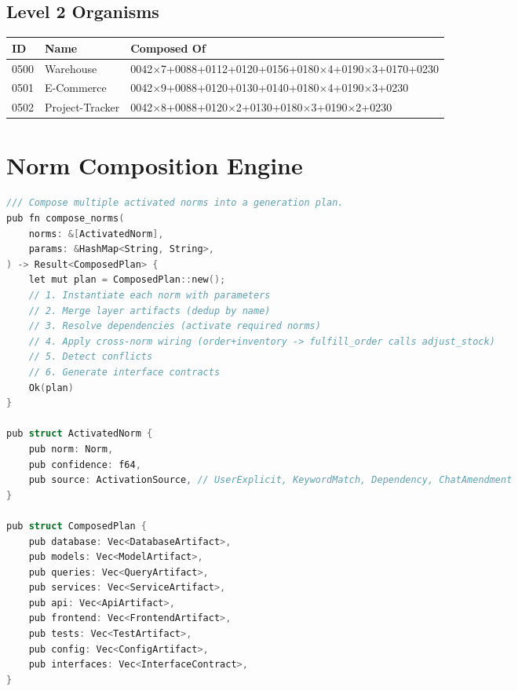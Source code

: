 \documentclass[11pt,a4paper]{article}
\begin{document}
\subsection{Level 2 Organisms}

\begin{center}
\scriptsize
\begin{tabular}{llp{8cm}}
\toprule
\textbf{ID} & \textbf{Name} & \textbf{Composed Of} \\
\midrule
0500 & Warehouse & 0042$\times$7+0088+0112+0120+0156+0180$\times$4+0190$\times$3+0170+0230 \\
0501 & E-Commerce & 0042$\times$9+0088+0120+0130+0140+0180$\times$4+0190$\times$3+0230 \\
0502 & Project-Tracker & 0042$\times$8+0088+0120$\times$2+0130+0180$\times$3+0190$\times$2+0230 \\
\bottomrule
\end{tabular}
\end{center}

\section{Norm Composition Engine}

\begin{lstlisting}[language=C]
/// Compose multiple activated norms into a generation plan.
pub fn compose_norms(
    norms: &[ActivatedNorm],
    params: &HashMap<String, String>,
) -> Result<ComposedPlan> {
    let mut plan = ComposedPlan::new();
    // 1. Instantiate each norm with parameters
    // 2. Merge layer artifacts (dedup by name)
    // 3. Resolve dependencies (activate required norms)
    // 4. Apply cross-norm wiring (order+inventory -> fulfill_order calls adjust_stock)
    // 5. Detect conflicts
    // 6. Generate interface contracts
    Ok(plan)
}

pub struct ActivatedNorm {
    pub norm: Norm,
    pub confidence: f64,
    pub source: ActivationSource, // UserExplicit, KeywordMatch, Dependency, ChatAmendment
}

pub struct ComposedPlan {
    pub database: Vec<DatabaseArtifact>,
    pub models: Vec<ModelArtifact>,
    pub queries: Vec<QueryArtifact>,
    pub services: Vec<ServiceArtifact>,
    pub api: Vec<ApiArtifact>,
    pub frontend: Vec<FrontendArtifact>,
    pub tests: Vec<TestArtifact>,
    pub config: Vec<ConfigArtifact>,
    pub interfaces: Vec<InterfaceContract>,
}
\end{lstlisting}
\end{document}
